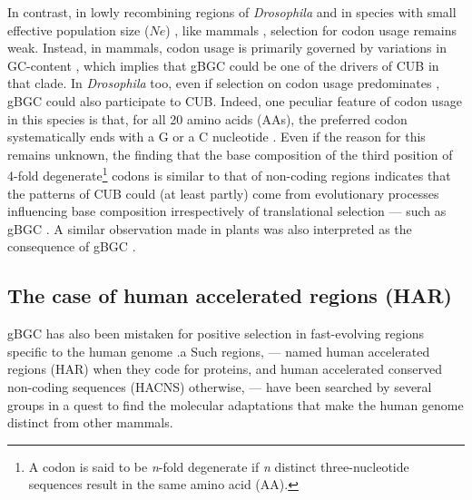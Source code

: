 In contrast, in lowly recombining regions of \textit{Drosophila} \citep{kliman1993reduced} and in species with small effective population size ($Ne$) \citep{subramanian2008nearly,galtier2018codon}, like mammals \citep{urrutia2003signature,comeron2004selective,lavner2005codon}, selection for codon usage remains weak.
Instead, in mammals, codon usage is primarily governed by variations in GC-content \citep[but see \citealp{doherty2013translational}]{semon2006no,rudolph2016codondriven,pouyet2017recombination}, which implies that gBGC could be one of the drivers of CUB in that clade.
In \textit{Drosophila} too, even if selection on codon usage predominates \citep{zeng2009estimating,zeng2010studying,zeng2010simple}, gBGC could also participate to CUB\@.
Indeed, one peculiar feature of codon usage in this species is that, for all 20 amino acids (AAs), the preferred codon systematically ends with a G or a C nucleotide \citep[reviewed in][]{duret2009biased}.
Even if the reason for this remains unknown, the finding that the base composition of the third position of 4-fold degenerate\footnote{A codon is said to be \textit{n}-fold degenerate if \textit{n} distinct three-nucleotide sequences result in the same amino acid (AA).} codons is similar to that of non-coding regions \citep{clay2011gc3} indicates that the patterns of CUB could (at least partly) come from evolutionary processes influencing base composition irrespectively of translational selection — such as gBGC \citep[but see \citealp{jackson2017variation}]{duret2002evolution,galtier2006gcbiased,lynch2007origins}. 
A similar observation made in plants was also interpreted as the consequence of gBGC \citep{clement2017evolutionary}.




\subsection{The case of human accelerated regions (HAR)}

gBGC has also been mistaken for positive selection in fast-evolving regions specific to the human genome \citep[reviewed in][]{duret2009biased}.a
Such regions, — named human accelerated regions (HAR) when they code for proteins, and human accelerated conserved non-coding sequences (HACNS) otherwise, — have been searched by several groups \citep{pollard2006forces,pollard2006rna,prabhakar2006accelerated,bird2007fastevolving,bush2008genomewide,lindblad-toh2011highresolution} in a quest to find the molecular adaptations that make the human genome distinct from other mammals.

